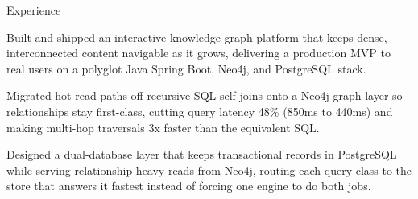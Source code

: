 \documentclass[
	11pt
]{../../../template}
\begin{document}
\begin{rSection}{E}{xperience}
\begin{rSectionEntry}
			\item Built and shipped an interactive knowledge-graph platform that keeps dense, interconnected content navigable as it grows, delivering a production MVP to real users on a polyglot Java Spring Boot, Neo4j, and PostgreSQL stack.
			\item Migrated hot read paths off recursive SQL self-joins onto a Neo4j graph layer so relationships stay first-class, cutting query latency 48\% (850ms to 440ms) and making multi-hop traversals 3x faster than the equivalent SQL.
			\item Designed a dual-database layer that keeps transactional records in PostgreSQL while serving relationship-heavy reads from Neo4j, routing each query class to the store that answers it fastest instead of forcing one engine to do both jobs.
		\end{rSectionEntry}
	\end{rSection}
\end{document}
